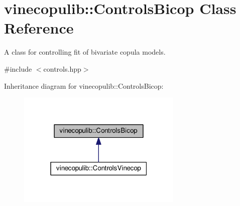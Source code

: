\hypertarget{classvinecopulib_1_1_controls_bicop}{}\section{vinecopulib\+:\+:Controls\+Bicop Class Reference}
\label{classvinecopulib_1_1_controls_bicop}


A class for controlling fit of bivariate copula models.  




{\ttfamily \#include $<$controls.\+hpp$>$}



Inheritance diagram for vinecopulib\+:\+:Controls\+Bicop\+:\nopagebreak
\begin{figure}[H]
\begin{center}
\leavevmode
\includegraphics[width=223pt]{classvinecopulib_1_1_controls_bicop__inherit__graph}
\end{center}
\end{figure}
